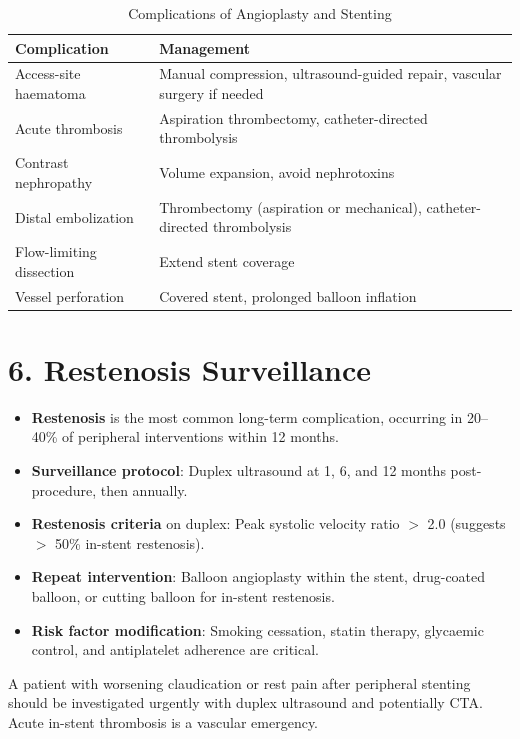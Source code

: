 \begin{table}[h]
\centering
\begin{tabular}{@{}p{}p{}@{}}
\hline
\textbf{Complication} & \textbf{Management} \\
\hline
Access-site haematoma & Manual compression, ultrasound-guided repair, vascular surgery if needed \\
Acute thrombosis & Aspiration thrombectomy, catheter-directed thrombolysis \\
Contrast nephropathy & Volume expansion, avoid nephrotoxins \\
Distal embolization & Thrombectomy (aspiration or mechanical), catheter-directed thrombolysis \\
Flow-limiting dissection & Extend stent coverage \\
Vessel perforation & Covered stent, prolonged balloon inflation \\
\hline
\end{tabular}
\caption{Complications of Angioplasty and Stenting}
\end{table}

\section{6. Restenosis Surveillance}

\begin{itemize}
  \item \textbf{Restenosis} is the most common long-term complication, occurring in 20--40\% of peripheral interventions within 12 months.
  \item \textbf{Surveillance protocol}: Duplex ultrasound at 1, 6, and 12 months post-procedure, then annually.
  \item \textbf{Restenosis criteria} on duplex: Peak systolic velocity ratio $>$ 2.0 (suggests $>$ 50\% in-stent restenosis).
  \item \textbf{Repeat intervention}: Balloon angioplasty within the stent, drug-coated balloon, or cutting balloon for in-stent restenosis.
  \item \textbf{Risk factor modification}: Smoking cessation, statin therapy, glycaemic control, and antiplatelet adherence are critical.
\end{itemize}

\begin{pearlbox}
A patient with worsening claudication or rest pain after peripheral stenting should be investigated urgently with duplex ultrasound and potentially CTA. Acute in-stent thrombosis is a vascular emergency.
\end{pearlbox}


